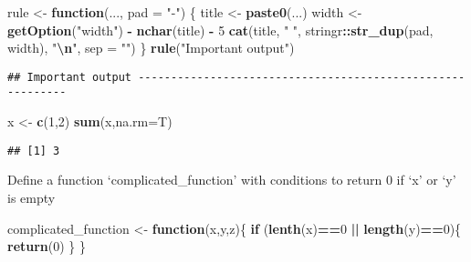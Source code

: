 \documentclass[
]{article}
\newenvironment{Shaded}{\begin{snugshade}}{\end{snugshade}}
\newcommand{\AttributeTok}[1]{\textcolor[rgb]{0.13,0.29,0.53}{#1}}
\newcommand{\ControlFlowTok}[1]{\textcolor[rgb]{0.13,0.29,0.53}{\textbf{#1}}}
\newcommand{\DecValTok}[1]{\textcolor[rgb]{0.00,0.00,0.81}{#1}}
\newcommand{\FunctionTok}[1]{\textcolor[rgb]{0.13,0.29,0.53}{\textbf{#1}}}
\newcommand{\NormalTok}[1]{#1}
\newcommand{\OtherTok}[1]{\textcolor[rgb]{0.56,0.35,0.01}{#1}}
\newcommand{\SpecialCharTok}[1]{\textcolor[rgb]{0.81,0.36,0.00}{\textbf{#1}}}
\newcommand{\StringTok}[1]{\textcolor[rgb]{0.31,0.60,0.02}{#1}}
\begin{document}
\begin{Shaded}
\begin{Highlighting}[]
\NormalTok{rule }\OtherTok{\textless{}{-}} \ControlFlowTok{function}\NormalTok{(..., }\AttributeTok{pad =} \StringTok{"{-}"}\NormalTok{) \{}
\NormalTok{  title }\OtherTok{\textless{}{-}} \FunctionTok{paste0}\NormalTok{(...)}
\NormalTok{  width }\OtherTok{\textless{}{-}} \FunctionTok{getOption}\NormalTok{(}\StringTok{"width"}\NormalTok{) }\SpecialCharTok{{-}} \FunctionTok{nchar}\NormalTok{(title) }\SpecialCharTok{{-}} \DecValTok{5}
  \FunctionTok{cat}\NormalTok{(title, }\StringTok{" "}\NormalTok{, stringr}\SpecialCharTok{::}\FunctionTok{str\_dup}\NormalTok{(pad, width), }\StringTok{"}\SpecialCharTok{\textbackslash{}n}\StringTok{"}\NormalTok{, }\AttributeTok{sep =} \StringTok{""}\NormalTok{)}
\NormalTok{\}}
\FunctionTok{rule}\NormalTok{(}\StringTok{"Important output"}\NormalTok{)}
\end{Highlighting}
\end{Shaded}

\begin{verbatim}
## Important output -----------------------------------------------------------
\end{verbatim}

\begin{Shaded}
\begin{Highlighting}[]
\NormalTok{x }\OtherTok{\textless{}{-}} \FunctionTok{c}\NormalTok{(}\DecValTok{1}\NormalTok{,}\DecValTok{2}\NormalTok{)}
\FunctionTok{sum}\NormalTok{(x,}\AttributeTok{na.rm=}\NormalTok{T)}
\end{Highlighting}
\end{Shaded}

\begin{verbatim}
## [1] 3
\end{verbatim}

Define a function `complicated\_function' with conditions to return 0 if
`x' or `y' is empty

\begin{Shaded}
\begin{Highlighting}[]
\NormalTok{complicated\_function }\OtherTok{\textless{}{-}} \ControlFlowTok{function}\NormalTok{(x,y,z)\{}
  \ControlFlowTok{if}\NormalTok{ (}\FunctionTok{lenth}\NormalTok{(x)}\SpecialCharTok{==}\DecValTok{0} \SpecialCharTok{||} \FunctionTok{length}\NormalTok{(y)}\SpecialCharTok{==}\DecValTok{0}\NormalTok{)\{}
    \FunctionTok{return}\NormalTok{(}\DecValTok{0}\NormalTok{)}
\NormalTok{  \}}
\NormalTok{\}}
\end{Highlighting}
\end{Shaded}
\end{document}
